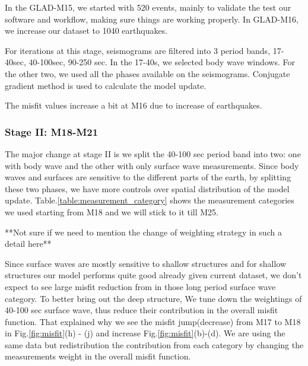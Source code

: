 \documentclass[extra,mreferee]{gji}
\begin{document}
In the GLAD-M15, we started with 520 events, mainly to validate the test our
software and workflow, making sure things are working properly.
In GLAD-M16, we increase our dataset to 1040 earthquakes.

For iterations at this stage, seismograms are filtered into 3 period bands,
17-40sec, 40-100sec, 90-250 sec. In the 17-40s, we selected body wave windows. For the
other two, we used all the phases available on the seismograms. Conjugate
gradient method is used to calculate the model update.

The misfit values increase a bit at M16 due to increase of earthquakes.

\subsubsection{Stage II: M18-M21}

The major change at stage II is we split the 40-100 sec period band into two: one with
body wave and the other with only surface wave measurements. Since body waves and
surfaces are sensitive to the different parts of the earth, by splitting these two
phases, we have more controls over spatial distribution of the model update.
Table.\ref{table:measurement_category} shows the measurement categories we used starting
from M18 and we will stick to it till M25.

**Not sure if we need to mention the change of weighting strategy in such a detail here**

Since surface waves are mostly sensitive to shallow
structures and for shallow structures our model performs quite good
already given current dataset, we don't expect to see large misfit
reduction from in those long period surface wave category.
To better bring out the deep structure, We tune
down the weightings of 40-100 sec surface wave, thus reduce their
contribution in the overall misfit function. That explained why we see the
misfit jump(decrease) from M17 to M18 in Fig.\ref{fig:misfit}(h) - (j) and
increase Fig.\ref{fig:misfit}(b)-(d). We are using the same data but
redistribution the contribution from each category by changing the measurements
weight in the overall misfit function.
\end{document}

